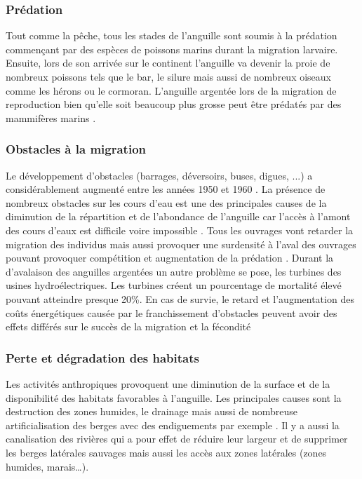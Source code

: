 \documentclass[11pt,titlepage,twoside]{article}\usepackage[]{graphicx}\usepackage[table]{xcolor}
\begin{document}
 
\subsubsection{Prédation}

Tout comme la pêche, tous les stades de l’anguille sont soumis à la prédation commençant par des espèces de poissons marins durant la migration larvaire. Ensuite, lors de son arrivée sur le continent l’anguille va devenir la proie de nombreux poissons tels que le bar, le silure mais aussi de nombreux oiseaux comme les hérons ou le cormoran. L’anguille argentée lors de la migration de reproduction bien qu’elle soit beaucoup plus grosse peut être prédatés par des mammifères marins \citep{brusle_anguille_1994, carpentier_effects_2009}.

\subsubsection{Obstacles à la migration}

Le développement d’obstacles (barrages, déversoirs, buses, digues, ...) a considérablement augmenté entre les années 1950 et 1960 \citep{miller_did_2016}. La présence de nombreux obstacles sur les cours d’eau est une des principales causes de la diminution de la répartition et de l’abondance de l’anguille car l’accès à l’amont des cours d’eaux est difficile voire impossible \citep{adam_anguille_2008}. Tous les ouvrages vont retarder la migration des individus mais aussi provoquer une surdensité à l’aval des ouvrages pouvant provoquer compétition et augmentation de la prédation \citep{bevacqua_intra-specific_2011,drouineau_assessing_2014}. Durant la d’avalaison des anguilles argentées un autre problème se pose, les turbines des usines hydroélectriques. Les turbines créent un pourcentage de mortalité élevé pouvant atteindre presque 20\%. En cas de survie, le retard et l'augmentation des coûts énergétiques causée par le franchissement d'obstacles peuvent avoir des effets différés sur le succès de la migration et la fécondité \citep{van_ginneken_eel_2000}

\subsubsection{Perte et dégradation des habitats}

Les activités anthropiques provoquent une diminution de la surface et de la disponibilité des habitats favorables à l’anguille. Les principales causes sont la destruction des zones humides, le drainage mais aussi de nombreuse artificialisation des berges avec des endiguements par exemple \citep{basset_unifying_2013}. Il y a aussi la canalisation des rivières qui a pour effet de réduire leur largeur et de supprimer les berges latérales sauvages mais aussi les accès aux zones latérales (zones humides, marais…).
\end{document}
